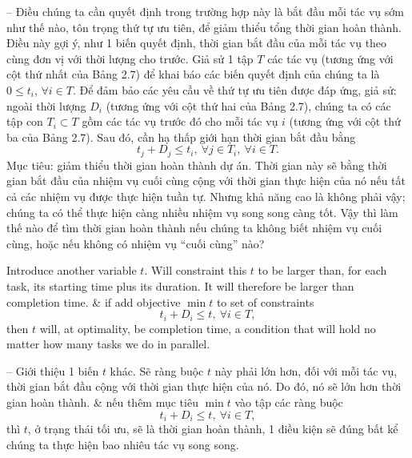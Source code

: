 \documentclass{article}
\begin{document}
\begin{itemize}
\begin{itemize}
\begin{itemize}
            -- Điều chúng ta cần quyết định trong trường hợp này là bắt đầu mỗi tác vụ sớm như thế nào, tôn trọng thứ tự ưu tiên, để giảm thiểu tổng thời gian hoàn thành. Điều này gợi ý, như 1 biến quyết định, thời gian bắt đầu của mỗi tác vụ theo cùng đơn vị với thời lượng cho trước. Giả sử 1 tập $T$ các tác vụ (tương ứng với cột thứ nhất của Bảng 2.7) để khai báo các biến quyết định của chúng ta là $0\le t_i$, $\forall i\in T$. Để đảm bảo các yêu cầu về thứ tự ưu tiên được đáp ứng, giả sử: ngoài thời lượng $D_i$ (tương ứng với cột thứ hai của Bảng 2.7), chúng ta có các tập con $T_i\subset T$ gồm các tác vụ trước đó cho mỗi tác vụ $i$ (tương ứng với cột thứ ba của Bảng 2.7). Sau đó, cần hạ thấp giới hạn thời gian bắt đầu bằng
            \begin{equation*}
                t_j + D_j\le t_i,\ \forall j\in T_i,\ \forall i\in T.
            \end{equation*}
            Mục tiêu: giảm thiểu thời gian hoàn thành dự án. Thời gian này sẽ bằng thời gian bắt đầu của nhiệm vụ cuối cùng cộng với thời gian thực hiện của nó nếu tất cả các nhiệm vụ được thực hiện tuần tự. Nhưng khả năng cao là không phải vậy; chúng ta có thể thực hiện càng nhiều nhiệm vụ song song càng tốt. Vậy thì làm thế nào để tìm thời gian hoàn thành nếu chúng ta không biết nhiệm vụ cuối cùng, hoặc nếu không có nhiệm vụ ``cuối cùng'' nào?

            Introduce another variable $t$. Will constraint this $t$ to be larger than, for each task, its starting time plus its duration. It will therefore be larger than completion time. \& if add objective $\min t$ to set of constraints
            \begin{equation*}
                t_i + D_i\le t,\ \forall i\in T,
            \end{equation*}
            then $t$ will, at optimality, be completion time, a condition that will hold no matter how many tasks we do in parallel.

            -- Giới thiệu 1 biến $t$ khác. Sẽ ràng buộc $t$ này phải lớn hơn, đối với mỗi tác vụ, thời gian bắt đầu cộng với thời gian thực hiện của nó. Do đó, nó sẽ lớn hơn thời gian hoàn thành. \& nếu thêm mục tiêu $\min t$ vào tập các ràng buộc
            \begin{equation*}
                t_i + D_i\le t, \ \forall i\in T,
            \end{equation*}
            thì $t$, ở trạng thái tối ưu, sẽ là thời gian hoàn thành, 1 điều kiện sẽ đúng bất kể chúng ta thực hiện bao nhiêu tác vụ song song.


\end{itemize}
\end{itemize}
\end{itemize}
\end{document}
